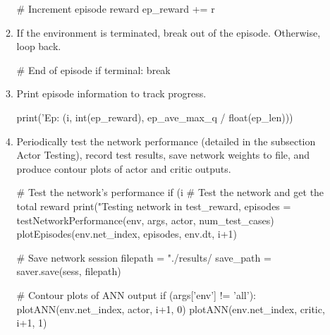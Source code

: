 \begin{enumerate}
\begin{enumerate}
\begin{python}[caption={Step Cleanup},label={list:ep_clean},xleftmargin=\dimexpr-\csname @totalleftmargin\endcsname]
# Increment episode reward
ep_reward += r
	\end{python}
	\item If the environment is terminated, break out of the episode. Otherwise, loop back.
	\begin{python}[caption={Episode Termination},label={list:ep_term},xleftmargin=\dimexpr-\csname @totalleftmargin\endcsname]
# End of episode
if terminal:
  	break
	\end{python}
	\item Print episode information to track progress.
	\begin{python}[caption={Print Episode Results},label={list:print_ep},xleftmargin=\dimexpr-\csname @totalleftmargin\endcsname]
print('Ep: %
	(i, int(ep_reward), ep_ave_max_q / float(ep_len)))
	\end{python}
	\item Periodically test the network performance (detailed in the subsection Actor Testing), record test results, save network weights to file, and produce contour plots of actor and critic outputs.
	\begin{python}[caption={Network Evaluation},label={list:net_eval},xleftmargin=\dimexpr-\csname @totalleftmargin\endcsname]
# Test the network's performance
if (i %
    # Test the network and get the total reward
    print("Testing network in %
    test_reward, episodes = testNetworkPerformance(env, args, actor, num_test_cases)
    plotEpisodes(env.net_index, episodes, env.dt, i+1)

    # Save network session
    filepath = "./results/%
    save_path = saver.save(sess, filepath)

    # Contour plots of ANN output
    if (args['env'] != 'all'):
        plotANN(env.net_index, actor, i+1, 0)
        plotANN(env.net_index, critic, i+1, 1)
	\end{python}	
	\end{enumerate}
\end{enumerate}
